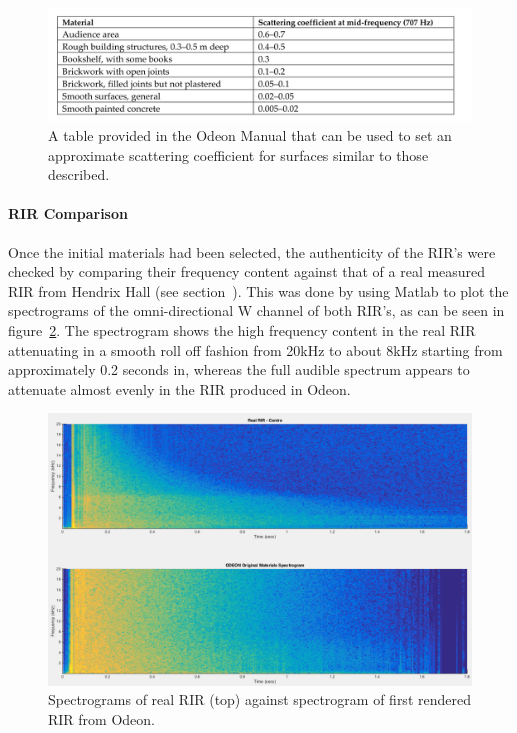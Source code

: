 \documentclass[../../main.tex]{subfiles}
\begin{document}
			\begin{figure}
				\centerline{\includegraphics[width=\textwidth]{Sections/Implementation/Odeon/images/scatteringCoefficients.png}}
				\caption{A table provided in the Odeon Manual \cite{odeonManual} that can be used to set an approximate scattering coefficient for surfaces similar to those described.}
				\label{odeonTable}
			\end{figure}
		
		\paragraph{RIR Comparison}
			\label{rirComparison}

			Once the initial materials had been selected, the authenticity of the \ac{RIR}'s were checked by comparing their frequency content against that of a real measured \ac{RIR} from Hendrix Hall (see section~). This was done by using Matlab to plot the spectrograms of the omni-directional W channel of both \ac{RIR}'s, as can be seen in figure~\ref{compareOriginal}. The spectrogram shows the high frequency content in the real \ac{RIR} attenuating in a smooth roll off fashion from 20kHz to about 8kHz starting from approximately 0.2 seconds in, whereas the full audible spectrum appears to attenuate almost evenly in the \ac{RIR} produced in Odeon.

			\begin{figure}
				\centerline{\includegraphics[width=\textwidth]{Sections/Implementation/Odeon/images/MaterialCompare/OriginalMaterials/original.png}}
				\caption{Spectrograms of real \ac{RIR} (top) against spectrogram of first rendered \ac{RIR} from Odeon.}
				\label{compareOriginal}
			\end{figure}
\end{document}
